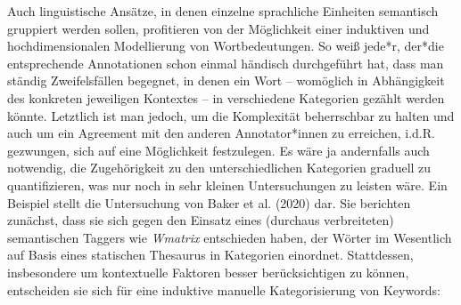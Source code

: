 Auch linguistische Ansätze, in denen einzelne sprachliche Einheiten semantisch gruppiert werden sollen, profitieren von der Möglichkeit einer induktiven und hochdimensionalen Modellierung von Wortbedeutungen. So weiß jede*r, der*die entsprechende Annotationen schon einmal händisch durchgeführt hat, dass man ständig Zweifelsfällen begegnet, in denen ein Wort -- womöglich in Abhängigkeit des konkreten jeweiligen Kontextes -- in verschiedene Kategorien gezählt werden könnte. Letztlich ist man jedoch, um die Komplexität beherrschbar zu halten und auch um ein Agreement mit den anderen Annotator*innen zu erreichen, i.d.R. gezwungen, sich auf eine Möglichkeit festzulegen. Es wäre ja andernfalls auch notwendig, die Zugehörigkeit zu den unterschiedlichen Kategorien graduell zu quantifizieren, was nur noch in sehr kleinen Untersuchungen zu leisten wäre. Ein Beispiel stellt die Untersuchung von Baker et al. (2020) dar. Sie berichten zunächst, dass sie sich gegen den Einsatz eines (durchaus verbreiteten) semantischen Taggers wie \emph{Wmatrix} \autocite{raysonKeyWordsKey2008} entschieden haben, der Wörter im Wesentlich auf Basis eines statischen Thesaurus in Kategorien einordnet. Stattdessen, insbesondere um kontextuelle Faktoren besser berücksichtigen zu können, entscheiden sie sich für eine induktive manuelle Kategorisierung von Keywords:


